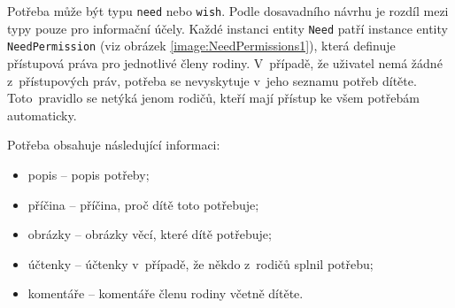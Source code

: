         Potřeba může být typu \verb|need| nebo \verb|wish|. Podle dosavadního návrhu je rozdíl mezi typy pouze pro informační účely. Každé instanci entity \verb|Need| patří instance entity \verb|NeedPermission| (viz obrázek \ref{image:NeedPermissions1}), která definuje přístupová práva pro jednotlivé členy rodiny. V~případě, že uživatel nemá žádné z~přístupových práv, potřeba se nevyskytuje v~jeho seznamu potřeb dítěte. Toto~pravidlo se netýká jenom rodičů, kteří mají přístup ke všem potřebám automaticky.
       
       Potřeba obsahuje následující informaci:
        \begin{itemize}
            \item popis -- popis potřeby;
            \item příčina -- příčina, proč dítě toto potřebuje;
            \item obrázky -- obrázky věcí, které dítě potřebuje;
            \item účtenky -- účtenky v~případě, že někdo z~rodičů splnil potřebu;
            \item komentáře -- komentáře členu rodiny včetně dítěte.
        \end{itemize}
    
